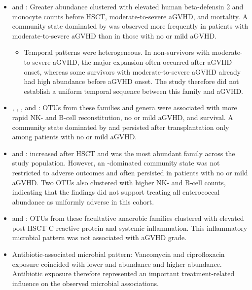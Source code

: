 \documentclass[11pt,a4paper]{article}
\begin{document}
\begin{itemize}

\item \taxLactobacillaceae and \taxLactobacillusSpp: Greater abundance clustered with elevated human beta-defensin 2 and monocyte counts before HSCT, moderate-to-severe aGVHD, and mortality. A community state dominated by \taxLactobacillaceae was observed more frequently in patients with moderate-to-severe aGVHD than in those with no or mild aGVHD.
  \begin{itemize}
  \item Temporal patterns were heterogeneous. In non-survivors with moderate-to-severe aGVHD, the major expansion often occurred after aGVHD onset, whereas some survivors with moderate-to-severe aGVHD already had high abundance before aGVHD onset. The study therefore did not establish a uniform temporal sequence between this family and aGVHD.
  \end{itemize}

\item \taxRuminococcaceae, \taxLachnospiraceae, \taxFaecalibacterium, and \taxBlautia: OTUs from these families and genera were associated with more rapid NK- and B-cell reconstitution, no or mild aGVHD, and survival. A community state dominated by \taxRuminococcaceae and \taxLachnospiraceae persisted after transplantation only among patients with no or mild aGVHD.

\item \taxEnterococcaceae and \taxEnterococcusSpp: \taxEnterococcaceae increased after HSCT and was the most abundant family across the study population. However, an \taxEnterococcaceae-dominated community state was not restricted to adverse outcomes and often persisted in patients with no or mild aGVHD. Two \taxEnterococcusSpp OTUs also clustered with higher NK- and B-cell counts, indicating that the findings did not support treating all enterococcal abundance as uniformly adverse in this cohort.

\item \taxEnterobacteriaceae and \taxStaphylococcaceae: OTUs from these facultative anaerobic families clustered with elevated post-HSCT C-reactive protein and systemic inflammation. This inflammatory microbial pattern was not associated with aGVHD grade.

\item Antibiotic-associated microbial pattern: Vancomycin and ciprofloxacin exposure coincided with lower \taxRuminococcaceae and \taxLachnospiraceae abundance and higher \taxEnterobacteriaceae abundance. Antibiotic exposure therefore represented an important treatment-related influence on the observed microbial associations.

\end{itemize}
\end{document}
